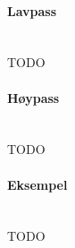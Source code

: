 \paragraph{Lavpass} \mbox{} \\
TODO



\paragraph{Høypass} \mbox{} \\
TODO



\paragraph{Eksempel} \mbox{} \\
TODO
